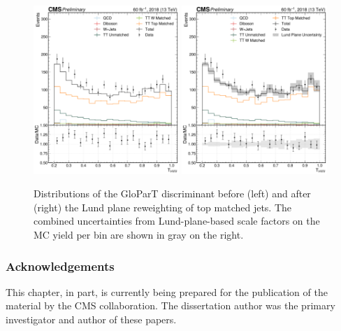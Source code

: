 \begin{figure}[hbt]
\centering
\includegraphics[width=0.49\textwidth]{figures/05-HH/part/pre_ak8FatJetParTMD_THWW4q-prelim.pdf}
\includegraphics[width=0.49\textwidth]{figures/05-HH/part/postlnN_ak8FatJetParTMD_THWW4q-prelim.pdf}
\caption[Distributions of the GloParT \THWW discriminant before and after the Lund plane reweighting of top matched jets.]{Distributions of the GloParT \THWW discriminant before (left) and after (right) the Lund plane reweighting of top matched jets.
The combined uncertainties from Lund-plane-based scale factors on the MC yield per bin are shown in gray on the right.
\label{fig:05_part_ttbar}
}
\end{figure}

\subsubsection{Acknowledgements}

This chapter, in part, is currently being prepared for the publication of the material by the CMS collaboration.
The dissertation author was the primary investigator and author of these papers.

